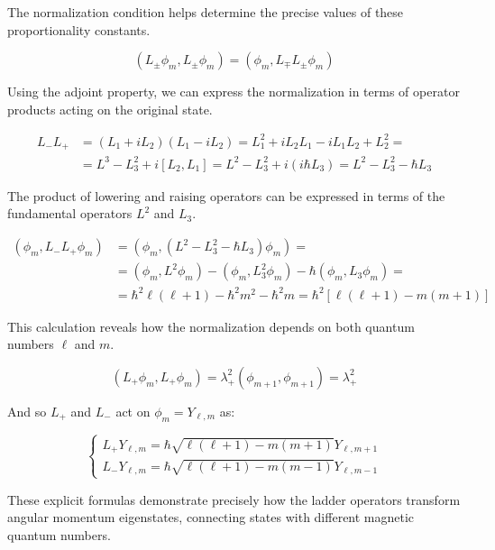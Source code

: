 The normalization condition helps determine the precise values of these proportionality constants.

\begin{equation}
\left(L_{ \pm} \phi_{m}, L_{ \pm} \phi_{m}\right)=\left(\phi_{m}, L_{\mp} L_{ \pm} \phi_{m}\right)
\end{equation}

Using the adjoint property, we can express the normalization in terms of operator products acting on the original state.

\begin{align}
L_{-} L_{+} & =\left(L_{1}+i L_{2}\right)\left(L_{1}-i L_{2}\right)=L_{1}^{2}+i L_{2} L_{1}-i L_{1} L_{2}+L_{2}^{2}= \\
& =L^{3}-L_{3}^{2}+i\left[L_{2}, L_{1}\right]=L^{2}-L_{3}^{2}+i\left(i \hbar L_{3}\right)=L^{2}-L_{3}^{2}-\hbar L_{3}
\end{align}

The product of lowering and raising operators can be expressed in terms of the fundamental operators $L^2$ and $L_3$.

\begin{align}
\left(\phi_{m}, L_{-} L_{+} \phi_{m}\right) & =\left(\phi_{m},\left(L^{2}-L_{3}^{2}-\hbar L_{3}\right) \phi_{m}\right)= \\
& =\left(\phi_{m}, L^{2} \phi_{m}\right)-\left(\phi_{m}, L_{3}^{2} \phi_{m}\right)-\hbar\left(\phi_{m}, L_{3} \phi_{m}\right)=  \\
& =\hbar^{2} \ell(\ell+1)-\hbar^{2} m^{2}-\hbar^{2} m=\hbar^{2}[\ell(\ell+1)-m(m+1)]
\end{align}

This calculation reveals how the normalization depends on both quantum numbers $\ell$ and $m$.

\begin{equation}
\left(L_{+} \phi_{m}, L_{+} \phi_{m}\right)=\lambda_{+}^{2}\left(\phi_{m+1}, \phi_{m+1}\right)=\lambda_{+}^{2}
\end{equation}

And so $L_{+}$ and $L_{-}$ act on $\phi_{m}=Y_{\ell, m}$ as:

\[
\left\{\begin{array}{l}
L_{+} Y_{\ell, m}=\hbar \sqrt{\ell(\ell+1)-m(m+1)} Y_{\ell, m+1}  \\
L_{-} Y_{\ell, m}=\hbar \sqrt{\ell(\ell+1)-m(m-1)} Y_{\ell, m-1}
\end{array}\right.
\]

These explicit formulas demonstrate precisely how the ladder operators transform angular momentum eigenstates, connecting states with different magnetic quantum numbers.

